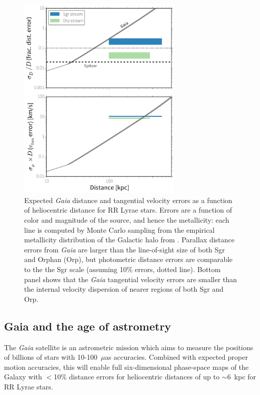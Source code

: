\begin{figure}[h!]
\begin{center}
\includegraphics[width=0.7\textwidth]{figures/ch1/fig1.pdf}

\caption{Expected {\it Gaia} distance and tangential velocity errors as a function of heliocentric distance for RR Lyrae stars. Errors are a function of color and magnitude of the source, and hence the metallicity: each line is computed
by Monte Carlo sampling from the empirical metallicity distribution of
the Galactic halo from \cite{ivezic08}. Parallax distance errors from {\it Gaia} are larger than the line-of-sight size of both Sgr and Orphan (Orp), but photometric distance errors are comparable to the the Sgr scale (assuming 10\% errors, dotted line). Bottom panel shows that the {\it Gaia} tangential velocity errors are smaller than the internal velocity dispersion of nearer regions of both Sgr and Orp. }\label{fig:gaia_errors}
\end{center}
\end{figure}

\subsection{Gaia and the age of astrometry}
\label{sec:gaia}
The {\it Gaia} satellite \citep{gaia01} is
an astrometric mission which aims to measure the positions of billions
of stars with 10-100~$\mu$as accuracies. Combined with expected 
proper motion accuracies, this will enable full six-dimensional phase-space 
maps of the Galaxy with $<$10\% distance errors for heliocentric distances of
up to $\sim$6~kpc for RR Lyrae stars.

